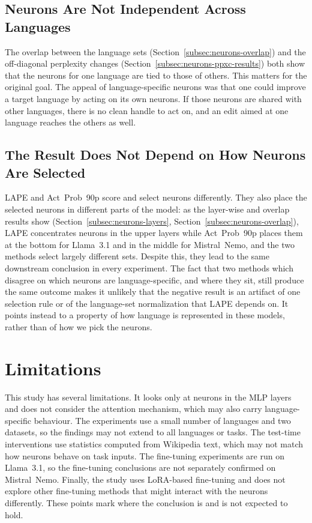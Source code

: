 \subsection{Neurons Are Not Independent Across Languages}
\label{subsec:neurons-independence}

The overlap between the language sets
(Section~\ref{subsec:neurons-overlap}) and the off-diagonal perplexity changes
(Section~\ref{subsec:neurons-ppxc-results}) both show that the neurons for one
language are tied to those of others. This matters for the original goal. The
appeal of language-specific neurons was that one could improve a target language by
acting on its own neurons. If those neurons are shared with other languages, there
is no clean handle to act on, and an edit aimed at one language reaches the others
as well.

\subsection{The Result Does Not Depend on How Neurons Are Selected}
\label{subsec:neurons-consistency}

LAPE and Act~Prob~90p score and select neurons differently. They also place the
selected neurons in different parts of the model: as the layer-wise and overlap
results show (Section~\ref{subsec:neurons-layers},
Section~\ref{subsec:neurons-overlap}), LAPE concentrates neurons in the upper
layers while Act~Prob~90p places them at the bottom for Llama~3.1 and in the middle
for Mistral~Nemo, and the two methods select largely different sets. Despite this,
they lead to the same downstream conclusion in every experiment. The fact that two
methods which disagree on which neurons are language-specific, and where they sit,
still produce the same outcome makes it unlikely that the negative result is an
artifact of one selection rule or of the language-set normalization that LAPE
depends on. It points instead to a property of how language is represented in these
models, rather than of how we pick the neurons.

\section{Limitations}
\label{sec:neurons-limitations}

This study has several limitations. It looks only at neurons in the MLP layers and
does not consider the attention mechanism, which may also carry language-specific
behaviour. The experiments use a small number of languages and two datasets, so the
findings may not extend to all languages or tasks. The test-time interventions use
statistics computed from Wikipedia text, which may not match how neurons behave on
task inputs. The fine-tuning experiments are run on Llama~3.1, so the fine-tuning
conclusions are not separately confirmed on Mistral~Nemo. Finally, the study uses
LoRA-based fine-tuning and does not explore other fine-tuning methods that might
interact with the neurons differently. These points mark where the conclusion is
and is not expected to hold.
